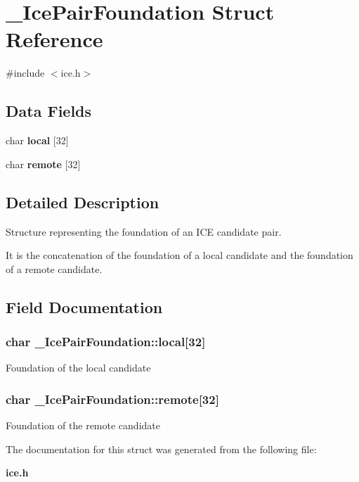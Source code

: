 \section{\-\_\-\-Ice\-Pair\-Foundation Struct Reference}
\label{struct__IcePairFoundation}


{\ttfamily \#include $<$ice.\-h$>$}

\subsection*{Data Fields}
\begin{DoxyCompactItemize}
\item 
char {\bf local} [32]
\item 
char {\bf remote} [32]
\end{DoxyCompactItemize}


\subsection{Detailed Description}
Structure representing the foundation of an I\-C\-E candidate pair.

It is the concatenation of the foundation of a local candidate and the foundation of a remote candidate. 

\subsection{Field Documentation}
\subsubsection[{local}]{\setlength{\rightskip}{0pt plus 5cm}char \-\_\-\-Ice\-Pair\-Foundation\-::local[32]}\label{struct__IcePairFoundation_aceda721078b766a33d0655ebfbc7da06}
Foundation of the local candidate 
\subsubsection[{remote}]{\setlength{\rightskip}{0pt plus 5cm}char \-\_\-\-Ice\-Pair\-Foundation\-::remote[32]}\label{struct__IcePairFoundation_a14468b6607f99f9543ad18275e0e56b7}
Foundation of the remote candidate 

The documentation for this struct was generated from the following file\-:\begin{DoxyCompactItemize}
\item 
{\bf ice.\-h}\end{DoxyCompactItemize}
